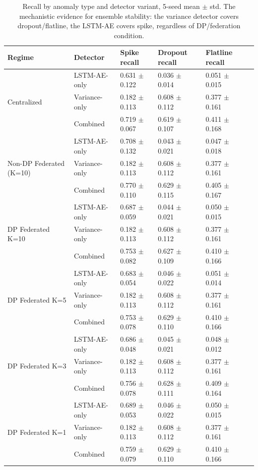 \begin{table}[t]
\centering
\caption{Recall by anomaly type and detector variant, 5-seed mean $\pm$ std. The mechanistic evidence for ensemble stability: the variance detector covers dropout/flatline, the LSTM-AE covers spike, regardless of DP/federation condition.}
\label{tab:m3-anomaly-breakdown}
\begin{tabular}{@{}llllll@{}}
\toprule
Regime & Detector & Spike recall & Dropout recall & Flatline recall \\
\midrule
\multirow{3}{*}{Centralized} & LSTM-AE-only & 0.631 $\pm$ 0.122 & 0.036 $\pm$ 0.014 & 0.051 $\pm$ 0.015 \\
 & Variance-only & 0.182 $\pm$ 0.113 & 0.608 $\pm$ 0.112 & 0.377 $\pm$ 0.161 \\
 & Combined & 0.719 $\pm$ 0.067 & 0.619 $\pm$ 0.107 & 0.411 $\pm$ 0.168 \\
\midrule
\multirow{3}{*}{Non-DP Federated (K=10)} & LSTM-AE-only & 0.708 $\pm$ 0.132 & 0.043 $\pm$ 0.021 & 0.047 $\pm$ 0.018 \\
 & Variance-only & 0.182 $\pm$ 0.113 & 0.608 $\pm$ 0.112 & 0.377 $\pm$ 0.161 \\
 & Combined & 0.770 $\pm$ 0.110 & 0.629 $\pm$ 0.115 & 0.405 $\pm$ 0.167 \\
\midrule
\multirow{3}{*}{DP Federated K=10} & LSTM-AE-only & 0.687 $\pm$ 0.059 & 0.044 $\pm$ 0.021 & 0.050 $\pm$ 0.015 \\
 & Variance-only & 0.182 $\pm$ 0.113 & 0.608 $\pm$ 0.112 & 0.377 $\pm$ 0.161 \\
 & Combined & 0.753 $\pm$ 0.082 & 0.627 $\pm$ 0.109 & 0.410 $\pm$ 0.166 \\
\midrule
\multirow{3}{*}{DP Federated K=5} & LSTM-AE-only & 0.683 $\pm$ 0.054 & 0.046 $\pm$ 0.022 & 0.051 $\pm$ 0.014 \\
 & Variance-only & 0.182 $\pm$ 0.113 & 0.608 $\pm$ 0.112 & 0.377 $\pm$ 0.161 \\
 & Combined & 0.753 $\pm$ 0.078 & 0.629 $\pm$ 0.110 & 0.410 $\pm$ 0.166 \\
\midrule
\multirow{3}{*}{DP Federated K=3} & LSTM-AE-only & 0.686 $\pm$ 0.048 & 0.045 $\pm$ 0.021 & 0.048 $\pm$ 0.012 \\
 & Variance-only & 0.182 $\pm$ 0.113 & 0.608 $\pm$ 0.112 & 0.377 $\pm$ 0.161 \\
 & Combined & 0.756 $\pm$ 0.078 & 0.628 $\pm$ 0.111 & 0.409 $\pm$ 0.164 \\
\midrule
\multirow{3}{*}{DP Federated K=1} & LSTM-AE-only & 0.689 $\pm$ 0.053 & 0.046 $\pm$ 0.022 & 0.050 $\pm$ 0.015 \\
 & Variance-only & 0.182 $\pm$ 0.113 & 0.608 $\pm$ 0.112 & 0.377 $\pm$ 0.161 \\
 & Combined & 0.759 $\pm$ 0.079 & 0.629 $\pm$ 0.110 & 0.410 $\pm$ 0.166 \\
\bottomrule
\end{tabular}
\end{table}
